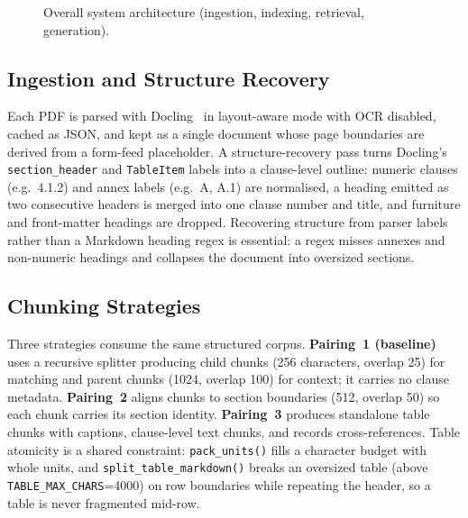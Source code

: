 \documentclass[conference]{IEEEtran}
\begin{document}
\begin{figure}[t]
\centering
{}
\caption{Overall system architecture (ingestion, indexing, retrieval, generation).}
\label{fig:arch}
\end{figure}

\subsection{Ingestion and Structure Recovery}
Each PDF is parsed with Docling~\cite{docling2024} in layout-aware mode with OCR disabled, cached as JSON, and kept as a single document whose page boundaries are derived from a form-feed placeholder. A structure-recovery pass turns Docling's \texttt{section\_header} and \texttt{TableItem} labels into a clause-level outline: numeric clauses (e.g.\ 4.1.2) and annex labels (e.g.\ A, A.1) are normalised, a heading emitted as two consecutive headers is merged into one clause number and title, and furniture and front-matter headings are dropped. Recovering structure from parser labels rather than a Markdown heading regex is essential: a regex misses annexes and non-numeric headings and collapses the document into oversized sections.

\subsection{Chunking Strategies}
Three strategies consume the same structured corpus. \textbf{Pairing~1 (baseline)} uses a recursive splitter producing child chunks (256 characters, overlap 25) for matching and parent chunks (1024, overlap 100) for context; it carries no clause metadata. \textbf{Pairing~2} aligns chunks to section boundaries (512, overlap 50) so each chunk carries its section identity. \textbf{Pairing~3} produces standalone table chunks with captions, clause-level text chunks, and records cross-references. Table atomicity is a shared constraint: \texttt{pack\_units()} fills a character budget with whole units, and \texttt{split\_table\_markdown()} breaks an oversized table (above \texttt{TABLE\_MAX\_CHARS}=4000) on row boundaries while repeating the header, so a table is never fragmented mid-row.
\end{document}
